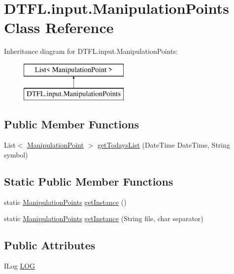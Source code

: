 \hypertarget{class_d_t_f_l_1_1input_1_1_manipulation_points}{}\section{D\+T\+F\+L.\+input.\+Manipulation\+Points Class Reference}
\label{class_d_t_f_l_1_1input_1_1_manipulation_points}
Inheritance diagram for D\+T\+F\+L.\+input.\+Manipulation\+Points\+:\begin{figure}[H]
\begin{center}
\leavevmode
\includegraphics[height=2.000000cm]{class_d_t_f_l_1_1input_1_1_manipulation_points}
\end{center}
\end{figure}
\subsection*{Public Member Functions}
\begin{DoxyCompactItemize}
\item 
List$<$ \hyperlink{class_d_t_f_l_1_1input_1_1_manipulation_point}{Manipulation\+Point} $>$ \hyperlink{class_d_t_f_l_1_1input_1_1_manipulation_points_a621a8736283846acb4448c5c3798e836}{get\+Todays\+List} (Date\+Time Date\+Time, String symbol)
\end{DoxyCompactItemize}
\subsection*{Static Public Member Functions}
\begin{DoxyCompactItemize}
\item 
static \hyperlink{class_d_t_f_l_1_1input_1_1_manipulation_points}{Manipulation\+Points} \hyperlink{class_d_t_f_l_1_1input_1_1_manipulation_points_a4dc2505e8f6e152fe5a735da47764624}{get\+Instance} ()
\item 
static \hyperlink{class_d_t_f_l_1_1input_1_1_manipulation_points}{Manipulation\+Points} \hyperlink{class_d_t_f_l_1_1input_1_1_manipulation_points_adf6732f4b18118502c053fb3262c36c6}{get\+Instance} (String file, char separator)
\end{DoxyCompactItemize}
\subsection*{Public Attributes}
\begin{DoxyCompactItemize}
\item 
I\+Log \hyperlink{class_d_t_f_l_1_1input_1_1_manipulation_points_aff493fad936a4768580539f005a30a40}{L\+OG}
\end{DoxyCompactItemize}


